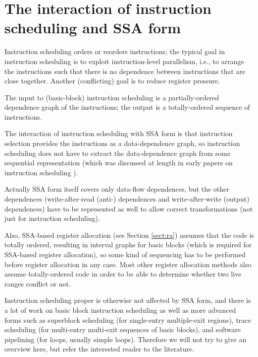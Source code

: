 \chapter{The interaction of instruction scheduling and SSA form }

%

Instruction scheduling orders or reorders instructions; the typical
goal in instruction scheduling is to exploit instruction-level
parallelism, i.e., to arrange the instructions such that there is no
dependence between instructions that are close together.  Another
(conflicting) goal is to reduce register pressure.

The input to (basic-block) instruction scheduling is a
partially-ordered dependence graph of the instructions; the output is
a totally-ordered sequence of instructions.

The interaction of instruction scheduling with SSA form is that
instruction selection provides the instructions as a data-dependence
graph, so instruction scheduling does not have to extract the
data-dependence graph from some sequential representation (which was
discussed at length in early papers on instruction scheduling
\cite{...}).

Actually SSA form itself covers only data-flow dependences, but the
other dependences (write-after-read (anti-) dependences and
write-after-write (output) dependences) have to be represented as well
to allow correct transformations (not just for instruction
scheduling).

Also, SSA-based register allocation (see Section \ref{sect:ra})
assumes that the code is totally ordered, resulting in interval graphs
for basic blocks (which is required for SSA-based register
allocation), so some kind of sequencing has to be performed before
register allocation in any case.  Most other register allocation
methods also assume totally-ordered code in order to be able to
determine whether two live ranges conflict or not.

Instruction scheduling proper is otherwise not affected by SSA form,
and there is a lot of work on basic block instruction scheduling
\cite{...} as well as more advanced forms such as superblock
scheduling \cite{...} (for single-entry multiple-exit regions), trace
scheduling \cite{...} (for multi-entry multi-exit sequences of basic
blocks), and software pipelining \cite{...} (for loops, usually simple
loops).  Therefore we will not try to give an overview here, but refer
the interested reader to the literature.
